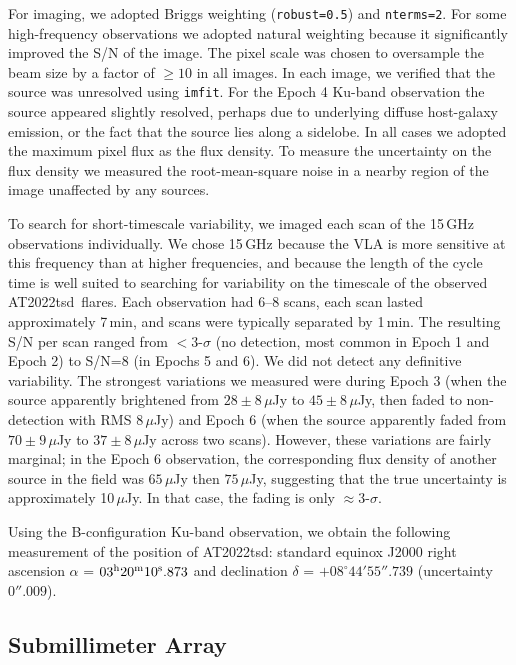 \documentclass{nature_plusfigure}
\newcommand{\at}{AT2022tsd}
\begin{document}
\begin{methods}
For imaging, we adopted Briggs weighting (\texttt{robust=0.5}) and \texttt{nterms=2}. For some high-frequency observations we adopted natural weighting because it significantly improved the S/N of the image.
The pixel scale was chosen to oversample the beam size by a factor of $\geq10$ in all images.
In each image, we verified that the source was unresolved using \texttt{imfit}.
For the Epoch 4 Ku-band observation the source appeared slightly resolved, perhaps due to underlying diffuse host-galaxy emission, or the fact that the source lies along a sidelobe.
In all cases we adopted the maximum pixel flux as the flux density.
To measure the uncertainty on the flux density we measured the root-mean-square noise in a nearby region of the image unaffected by any sources.

To search for short-timescale variability, we imaged each scan of the 15\,GHz observations individually. We chose 15\,GHz because the VLA is more sensitive at this frequency than at higher frequencies, and because the length of the cycle time is well suited to searching for variability on the timescale of the observed \at\ flares. Each observation had 6--8 scans, each scan lasted approximately 7\,min, and scans were typically separated by 1\,min. The resulting S/N per scan ranged from $<3$-$\sigma$ (no detection, most common in Epoch 1 and Epoch 2) to S/N=8 (in Epochs 5 and 6).
We did not detect any definitive variability. The strongest variations we measured were during Epoch 3 (when the source apparently brightened from $28\pm8\,\mu$Jy to $45\pm8\,\mu$Jy, then faded to non-detection with RMS $8\,\mu$Jy) and Epoch 6 (when the source apparently faded from $70\pm9\,\mu$Jy to $37\pm8\,\mu$Jy across two scans). However, these variations are fairly marginal; in the Epoch 6 observation, the corresponding flux density of another source in the field was $65\,\mu$Jy then $75\,\mu$Jy, suggesting that the true uncertainty is approximately 10$\,\mu$Jy. In that case, the fading is only $\approx3$-$\sigma$.

Using the B-configuration Ku-band observation, we obtain the following measurement of the position of \at:
standard equinox J2000 right ascension $\alpha$ =
$03^{\rm{h}}20^{\rm{m}}10^{\rm{s}}.873$
and declination $\delta$ = $+08^{\circ} 44' 55''.739$ 
(uncertainty $0''.009$).

\subsection{Submillimeter Array}
\label{Methods:SMA}


\end{methods}
\end{document}

